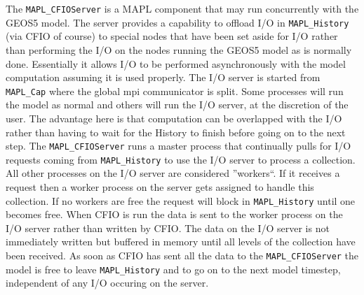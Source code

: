 %  
%  
%  
The {\tt MAPL\_CFIOServer} is a MAPL component that may run concurrently with the GEOS5 model.
The server provides a capability to offload I/O in {\tt MAPL\_History} (via CFIO of course) to special nodes that have been set aside for I/O rather than
performing the I/O on the nodes running the GEOS5 model as is normally done.
Essentially it allows I/O to be performed asynchronously with the model computation assuming it is used properly.
The I/O server is started
from {\tt MAPL\_Cap} where the global mpi communicator is split. Some processes will run the model as normal and others will run the I/O server, at the discretion of the user.
The advantage here is that computation can be
overlapped with the I/O rather than having to wait for the History to finish before going on to the next step.
The {\tt MAPL\_CFIOServer} runs a master process that continually pulls for I/O
requests coming from {\tt MAPL\_History} to use the I/O server to process a collection.
All other processes on the I/O server are considered ''workers``.
If it receives a request then a worker process on the server gets assigned to handle this collection.
If no workers are free the request will block in {\tt MAPL\_History} until one becomes free.
When CFIO is run the data is sent to the worker process on the I/O server rather than written by CFIO. 
The data on the I/O server is not immediately written but buffered in memory until all levels of the collection have been received. As soon as CFIO has sent all the data to the {\tt MAPL\_CFIOServer} the model is free to leave {\tt MAPL\_History} and to go on to the next model timestep, independent of any I/O occuring on the server.

